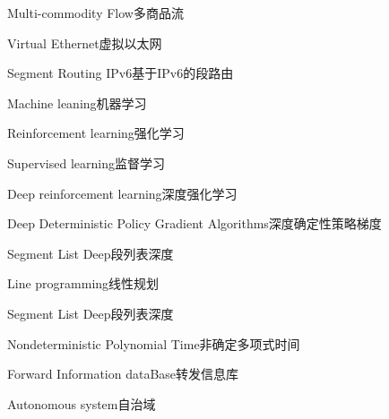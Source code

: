 {Multi-commodity Flow}{多商品流}

{Virtual Ethernet}{虚拟以太网}

{Segment Routing IPv6}{基于IPv6的段路由}

{Machine leaning}{机器学习}

{Reinforcement learning}{强化学习}

{Supervised learning}{监督学习}

{Deep reinforcement learning}{深度强化学习}

{Deep Deterministic Policy Gradient Algorithms}{深度确定性策略梯度}

{Segment List Deep}{段列表深度}

{Line programming}{线性规划}

{Segment List Deep}{段列表深度}

{Nondeterministic Polynomial Time}{非确定多项式时间}

{Forward Information dataBase}{转发信息库}

{Autonomous system}{自治域}